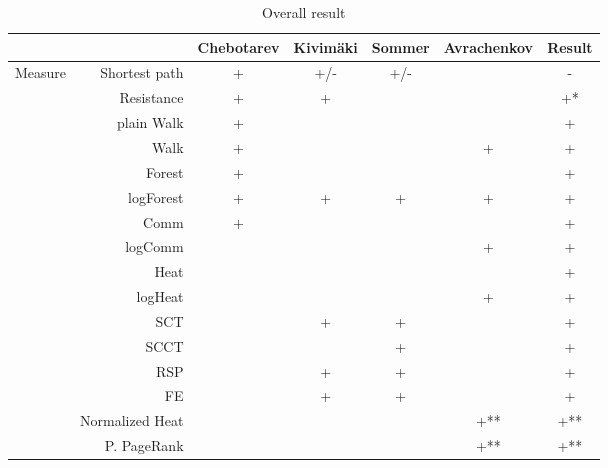 \documentclass{article}
\begin{document}
\begin{table}[H]
\centering
\caption{Overall result}
\label{my-label}
\begin{tabular}{rr|cccc|c}
                &                          & Chebotarev & Kivim{\"a}ki & Sommer & Avrachenkov & Result \\
                \hline
\multirow{18}{*}{Measure} & Shortest path  & +          & \cellcolor{red!25} +/- & \cellcolor{red!25} +/- & & \cellcolor{red!25} - \\
                & Resistance               & +          & +        &        &             &  \cellcolor{yellow!25} +* \\
                & plain Walk               & +          &          &        &             & +      \\
                & Walk                     & +          &          &        & +           & +      \\
                & Forest                   & +          &          &        &             & +      \\
                & logForest                & +          & +        & +      & +           & +      \\
                & Comm                     & +          &          &        &             & +      \\
                & logComm                  &            &          &        & +           & +      \\
                & Heat                     &            &          &        &             & \cellcolor{yellow!25} + \\
                & logHeat                  &            &          &        & +           & +      \\
                & SCT                      &            & +        & +      &             & +      \\
                & SCCT                     &            &          & +      &             & +      \\
                & RSP                      &            & +        & +      &             & +      \\
                & FE                       &            & +        & +      &             & +      \\
                & Normalized Heat          &            &          &        & +**         & \cellcolor{yellow!25} +** \\
                & P. PageRank              &            &          &        & +**         & \cellcolor{yellow!25} +** \\

\end{tabular}
\end{table}
\end{document}
